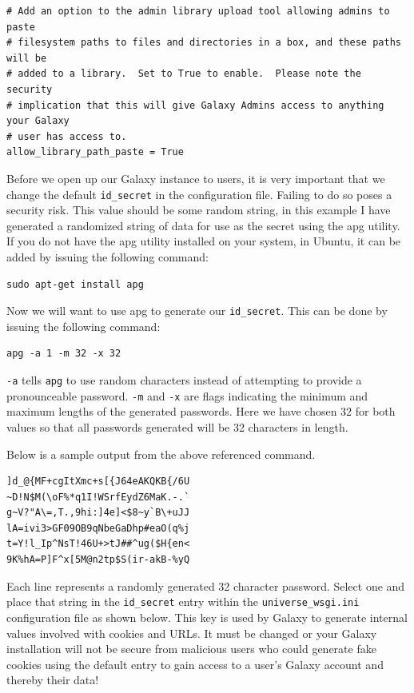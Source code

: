 \documentclass[a4paper,10pt]{article}
\begin{document}
\begin{lstlisting}
# Add an option to the admin library upload tool allowing admins to paste
# filesystem paths to files and directories in a box, and these paths will be
# added to a library.  Set to True to enable.  Please note the security
# implication that this will give Galaxy Admins access to anything your Galaxy
# user has access to.
allow_library_path_paste = True
\end{lstlisting}

Before we open up our Galaxy instance to users, it is very important that we change the default \texttt{\footnotesize{id\_secret}} in the configuration file.  Failing to do so poses a security risk.  This value should be some random string, in this example I have generated a randomized string of data for use as the secret using the apg utility.  If you do not have the apg utility installed on your system, in Ubuntu, it can be added by issuing the following command:

\begin{lstlisting}
sudo apt-get install apg
\end{lstlisting}

Now we will want to use apg to generate our \texttt{\footnotesize{id\_secret}}.  This can be done by issuing the following command:

\begin{lstlisting}
apg -a 1 -m 32 -x 32
\end{lstlisting}

\texttt{\footnotesize{-a}} tells \texttt{\footnotesize{apg}} to use random characters instead of attempting to provide a pronounceable password.  \texttt{\footnotesize{-m}} and \texttt{\footnotesize{-x}} are flags indicating the minimum and maximum lengths of the generated passwords.  Here we have chosen 32 for both values so that all passwords generated will be 32 characters in length.

Below is a sample output from the above referenced command.

\begin{lstlisting}
]d_@{MF+cgItXmc+s[{J64eAKQKB{/6U
~D!N$M(\oF%*q1I!WSrfEydZ6MaK.-.`
g~V?"A\=,T.,9hi:]4e]<$8~y`B\+uJJ
lA=ivi3>GF09OB9qNbeGaDhp#eaO(q%j
t=Y!l_Ip^NsT!46U+>tJ##^ug($H{en<
9K%hA=P]F^x[5M@n2tp$S(ir-akB-%yQ
\end{lstlisting}

Each line represents a randomly generated 32 character password.  Select one and place that string in the \texttt{\footnotesize{id\_secret}} entry within the \texttt{\footnotesize{universe\_wsgi.ini}} configuration file as shown below.  This key is used by Galaxy to generate internal values involved with cookies and URLs.  It must be changed or your Galaxy installation will not be secure from malicious users who could generate fake cookies using the default entry to gain access to a user's Galaxy account and thereby their data!
\end{document}
